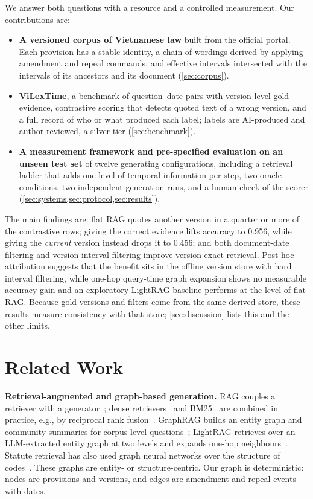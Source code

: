 \documentclass[sigconf,anonymous,review]{acmart}
\begin{document}
We answer both questions with a resource and a controlled measurement. Our contributions are:
\begin{itemize}
\item \textbf{A versioned corpus of Vietnamese law} built from the official portal. Each provision has a stable identity, a chain of wordings derived by applying amendment and repeal commands, and effective intervals intersected with the intervals of its ancestors and its document (\cref{sec:corpus}).
\item \textbf{ViLexTime}, a benchmark of question--date pairs with version-level gold evidence, contrastive scoring that detects quoted text of a wrong version, and a full record of who or what produced each label; labels are AI-produced and author-reviewed, a silver tier (\cref{sec:benchmark}).
\item \textbf{A measurement framework and pre-specified evaluation on an unseen test set} of twelve generating configurations, including a retrieval ladder that adds one level of temporal information per step, two oracle conditions, two independent generation runs, and a human check of the scorer (\cref{sec:systems,sec:protocol,sec:results}).
\end{itemize}
The main findings are: flat RAG quotes another version in a quarter or more of the contrastive rows; giving the correct evidence lifts accuracy to 0.956, while giving the \emph{current} version instead drops it to 0.456; and both document-date filtering and version-interval filtering improve version-exact retrieval. Post-hoc attribution suggests that the benefit sits in the offline version store with hard interval filtering, while one-hop query-time graph expansion shows no measurable accuracy gain and an exploratory LightRAG baseline performs at the level of flat RAG. Because gold versions and filters come from the same derived store, these results measure consistency with that store; \cref{sec:discussion} lists this and the other limits.

\section{Related Work}
\label{sec:related}

\textbf{Retrieval-augmented and graph-based generation.} RAG couples a retriever with a generator~\cite{lewis2020rag}; dense retrievers~\cite{karpukhin2020dpr} and BM25~\cite{robertson2009bm25} are combined in practice, e.g., by reciprocal rank fusion~\cite{cormack2009rrf}. GraphRAG builds an entity graph and community summaries for corpus-level questions~\cite{edge2024graphrag}; LightRAG retrieves over an LLM-extracted entity graph at two levels and expands one-hop neighbours~\cite{guo2025lightrag}. Statute retrieval has also used graph neural networks over the structure of codes~\cite{louis2023finding}. These graphs are entity- or structure-centric. Our graph is deterministic: nodes are provisions and versions, and edges are amendment and repeal events with dates.
\end{document}
